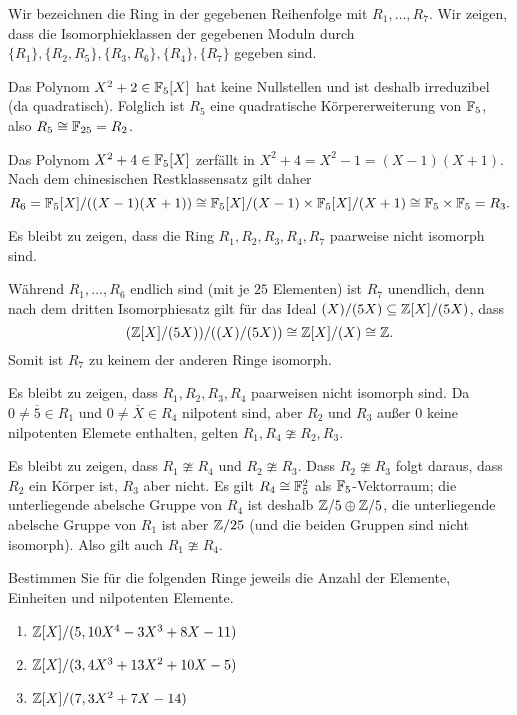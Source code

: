 \begin{solution}
  Wir bezeichnen die Ring in der gegebenen Reihenfolge mit $R_1, \dotsc, R_7$.
  Wir zeigen, dass die Isomorphieklassen der gegebenen Moduln durch $\{R_1\}, \{R_2, R_5\}, \{R_3, R_6\}, \{R_4\}, \{R_7\}$ gegeben sind.
  
  Das Polynom $X^2 + 2 \in \mathbb{F}_5[X]$ hat keine Nullstellen und ist deshalb irreduzibel (da quadratisch).
  Folglich ist $R_5$ eine quadratische Körpererweiterung von $\mathbb{F}_5$, also $R_5 \cong \mathbb{F}_{25} = R_2$.
  
  Das Polynom $X^2 + 4 \in \mathbb{F}_5[X]$ zerfällt in $X^2 + 4 = X^2 - 1 = (X-1)(X+1)$.
  Nach dem chinesischen Restklassensatz gilt daher
  \[
          R_6
    =     \mathbb{F}_5[X]/((X-1)(X+1))
    \cong \mathbb{F}_5[X]/(X-1) \times \mathbb{F}_5[X]/(X+1)
    \cong \mathbb{F}_5 \times \mathbb{F}_5
    =     R_3.
  \]
  
  Es bleibt zu zeigen, dass die Ring $R_1, R_2, R_3, R_4, R_7$ paarweise nicht isomorph sind.
  
  Während $R_1, \dotsc, R_6$ endlich sind (mit je $25$ Elementen) ist $R_7$ unendlich, denn nach dem dritten Isomorphiesatz gilt für das Ideal $(X)/(5X) \subseteq \mathbb{Z}[X]/(5X)$, dass
  \[
           (\mathbb{Z}[X]/(5X))/((X)/(5X))
    \cong \mathbb{Z}[X]/(X)
    \cong \mathbb{Z}.
  \]
  Somit ist $R_7$ zu keinem der anderen Ringe isomorph.
  
  Es bleibt zu zeigen, dass $R_1, R_2, R_3, R_4$ paarweisen nicht isomorph sind.
  Da $0 \neq \overline{5} \in R_1$ und $0 \neq \overline{X} \in R_4$ nilpotent sind, aber $R_2$ und $R_3$ außer $0$ keine nilpotenten Elemete enthalten, gelten $R_1, R_4 \ncong R_2, R_3$.
  
  Es bleibt zu zeigen, dass $R_1 \ncong R_4$ und $R_2 \ncong R_3$.
  Dass $R_2 \ncong R_3$ folgt daraus, dass $R_2$ ein Körper ist, $R_3$ aber nicht.
  Es gilt $R_4 \cong \mathbb{F}_5^2$ als $\mathbb{F}_5$-Vektorraum;
  die unterliegende abelsche Gruppe von $R_4$ ist deshalb $\mathbb{Z}/5 \oplus \mathbb{Z}/5$, die unterliegende abelsche Gruppe von $R_1$ ist aber $\mathbb{Z}/25$ (und die beiden Gruppen sind nicht isomorph).
  Also gilt auch $R_1 \ncong R_4$.
\end{solution}


\begin{question}[subtitle = Vereinfachung von Quotienten]
  Bestimmen Sie für die folgenden Ringe jeweils die Anzahl der Elemente, Einheiten und nilpotenten Elemente.
  \begin{enumerate}
    \item
      $\mathbb{Z}[X]/(5, 10 X^4 - 3 X^3 + 8 X - 11)$
    \item
      $\mathbb{Z}[X]/(3, 4 X^3 + 13 X^2 + 10 X - 5)$
    \item
      $\mathbb{Z}[X]/(7, 3 X^2 + 7X - 14)$
  \end{enumerate}
\end{question}


